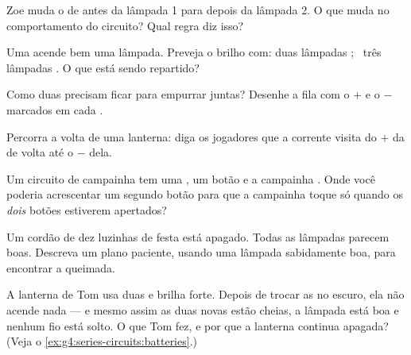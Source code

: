 \begin{exercise}[$\star$]\label{exo:g4:series-circuits:4}
Zoe muda o  de antes da lâmpada 1 para depois da lâmpada
2. O que muda no comportamento do circuito? Qual regra diz isso?
\end{exercise}

\begin{exercise}[$\star$]\label{exo:g4:series-circuits:5}
Uma  acende bem uma lâmpada. Preveja o brilho com: duas lâmpadas
; \ três lâmpadas . O que está sendo repartido?
\end{exercise}

\begin{exercise}[$\star$]\label{exo:g4:series-circuits:6}
Como duas  precisam ficar para empurrar juntas? Desenhe a fila
com o $+$ e o $-$ marcados em cada .
\end{exercise}

\begin{exercise}[$\star$]\label{exo:g4:series-circuits:7}
Percorra a volta de uma lanterna: diga os jogadores que a corrente
visita do $+$ da  de volta até o $-$ dela.
\end{exercise}

\begin{exercise}[$\star$]\label{exo:g4:series-circuits:8}
Um circuito de campainha tem uma , um botão e a campainha . Onde você poderia acrescentar um segundo botão para que a
campainha toque só quando os \emph{dois} botões estiverem apertados?
\end{exercise}

\begin{exercise}[$\star$]\label{exo:g4:series-circuits:9}
Um cordão de dez luzinhas de festa  está apagado. Todas as
lâmpadas parecem boas. Descreva um plano paciente, usando uma lâmpada
sabidamente boa, para encontrar a queimada.
\end{exercise}

\begin{exercise}[$\star\star$]\label{exo:g4:series-circuits:10}
A lanterna de Tom usa duas  e brilha forte. Depois de trocar as
 no escuro, ela não acende nada --- e mesmo assim as duas
 novas estão cheias, a lâmpada está boa e nenhum fio está
solto. O que Tom fez, e por que a lanterna continua apagada? (Veja o
\cref{ex:g4:series-circuits:batteries}.)
\end{exercise}


